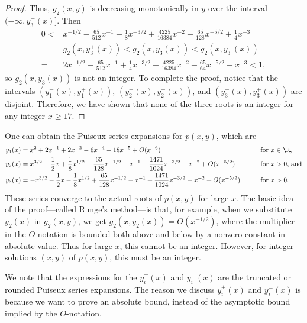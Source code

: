 \documentclass[11pt]{article}
\newenvironment{remark}{\medskip{\bfseries \noindent Remark:}}{\par\medskip}{\par\medskip}
\begin{document}
\begin{proof}
 Thus, $g_2(x,y)$ is decreasing monotonically in $y$ over the interval $(-\infty, y_3^+(x)]$.
 Then
 \begin{align*}
  0
  < {}& x^{-1/2} - \frac{65}{512} x^{-1} + \frac{1}{8} x^{-3/2} + \frac{4225}{16384} x^{-2} - \frac{65}{128} x^{-5/2} + \frac{1}{4} x^{-3}\\
  = {}&g_2(x, y_3^+(x))
  < g_2(x, y_3(x))
  < g_2(x, y_3^-(x))\\
  = {}& 2 x^{-1/2} - \frac{65}{512} x^{-1} + \frac{1}{4} x^{-3/2} + \frac{4225}{16384} x^{-2} - \frac{65}{64} x^{-5/2} + x^{-3}
  < 1,
 \end{align*}
 so $g_2(x, y_3(x))$ is not an integer.
 To complete the proof,
 notice that the intervals $(y_1^-(x), y_1^+(x))$, $(y_2^-(x), y_2^+(x))$, and $(y_3^-(x), y_3^+(x))$ are disjoint.
 Therefore, we have shown that none of the three roots is an integer for any integer $x \ge 17$.
\end{proof}

\begin{remark}
 One can obtain the Puiseux series expansions for $p(x,y)$,
 which are
 \begin{alignat*}{2}
  y_1(x) &= x^2 + 2 x^{-1} + 2 x^{-2} - 6 x^{-4} - 18 x^{-5} + O(x^{-6}) \qquad &&\text{for $x \in \R$,}\\
  y_2(x) &=  x^{3/2} - \frac{1}{2} x + \frac{1}{8} x^{1/2} - \frac{65}{128} x^{-1/2} - x^{-1} - \frac{1471}{1024} x^{-3/2} - x^{-2} + O(x^{-5/2}) \qquad &&\text{for $x>0$, and}\\
  y_3(x) &= -x^{3/2} - \frac{1}{2} x - \frac{1}{8} x^{1/2} + \frac{65}{128} x^{-1/2} - x^{-1} + \frac{1471}{1024} x^{-3/2} - x^{-2} + O(x^{-5/2}) \qquad &&\text{for $x>0$}.
 \end{alignat*}
 These series converge to the actual roots of $p(x,y)$ for large $x$.
 The basic idea of the proof---called Runge's method---is that,
 for example, when we substitute $y_2(x)$ in $g_2(x, y)$,
 we get $g_2(x, y_2(x)) = O(x^{-1/2})$,
 where the multiplier in the $O$-notation is bounded both above and below by a nonzero constant in absolute value.
 Thus for large $x$,
 this cannot be an integer.
 However, for integer solutions $(x,y)$ of $p(x,y)$,
 this must be an integer.

 We note that the expressions for the $y_i^+(x)$ and $y_i^-(x)$ are the truncated or rounded Puiseux series expansions.
 The reason we discuss $y_i^+(x)$ and $y_i^-(x)$ is because we want to prove an absolute bound,
 instead of the asymptotic bound implied by the $O$-notation.
\end{remark}
\end{document}
